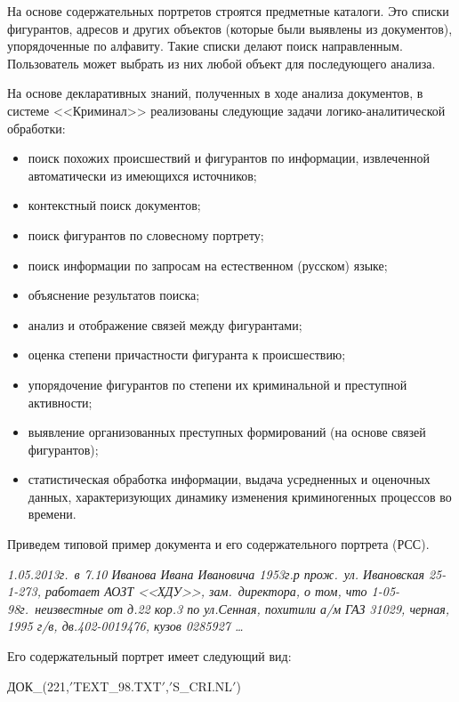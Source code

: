 \begin{multicols}{2}
 На основе содержательных портретов строятся предметные каталоги. Это
списки фигурантов, адресов и других объектов (которые были выявлены из
документов), упорядоченные по алфавиту. Такие списки делают поиск
направленным. Пользователь может выбрать из них любой объект для
последующего анализа.

 На основе декларативных знаний, полученных в ходе анализа
документов, в системе <<Криминал>> реализованы следующие задачи
ло\-ги\-ко-ана\-ли\-ти\-че\-ской обработки:
 \begin{itemize}
 \item поиск похожих происшествий и фигурантов по информации,
извлеченной автоматически из имеющихся источников;
 \item контекстный поиск документов;
 \item поиск фигурантов по словесному портрету;
 \item поиск информации по запросам на естественном (русском) языке;
 \item объяснение результатов поиска;
 \item анализ и отображение связей между фигурантами;
 \item оценка степени причастности фигуранта к происшествию;
 \item упорядочение фигурантов по степени их криминальной и
преступной активности;
 \item выявление организованных преступных формирований (на основе
связей фигурантов);
 \item статистическая обработка информации, выдача усредненных и
оценочных данных, характеризующих динамику изменения криминогенных
процессов во времени.
 \end{itemize}

Приведем типовой пример документа и его содержательного портрета (РСС).

 \medskip

 \noindent
 {\small \prg \textit{1.05.2013г.\ в 7.10 Иванова Ивана Ивановича 1953г.р прож.\ ул. Ивановская 25-1-273,
работает АОЗТ <<ХДУ>>, зам.\ директора, о том, что 1-05-98г.\ неизвестные от д.22
кор.3 по ул.Сенная, похитили а/м ГАЗ 31029, черная, 1995 г/в, дв.402-0019476, кузов
0285927 \ldots}}

 \medskip

 Его содержательный портрет имеет следующий вид:

 \medskip

{\small

\noindent
 ДОК\_(221,$'$TEXT\_98.TXT$'$,$'$S\_CRI.NL$'$)

}
\end{multicols}
